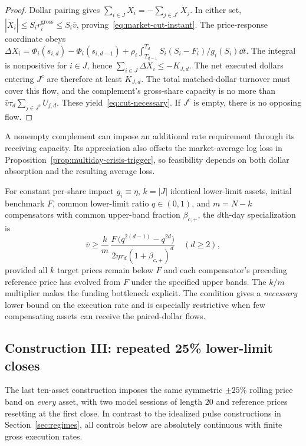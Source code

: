 \documentclass[review,hidelinks,onefignum,onetabnum]{siamonline250211}
\begin{document}
\begin{proof}
Dollar pairing gives $\sum_{i\in J}\dot X_i=-\sum_{j\in J^c}\dot X_j$. In either set, $|\dot X_i|\le S_i r_i^{\mathrm{gross}}\le S_i\bar v$, proving~\eqref{eq:market-cut-instant}. The price-response coordinate obeys
$\Delta X_i=\Phi_i(s_{i,d})-\Phi_i(s_{i,d-1})+
\rho_i\int_{T_{d-1}}^{T_d}S_i(S_i-F_i)/g_i(S_i)\dd t$.
The integral is nonpositive for $i\in J$, hence $\sum_{i\in J}\Delta X_i\le-K_{J,d}$. The net executed dollars entering $J^c$ are therefore at least $K_{J,d}$. The total matched-dollar turnover must cover this flow, and the complement's gross-share capacity is no more than $\bar v\tau_d\sum_{j\in J^c}U_{j,d}$. These yield~\eqref{eq:cut-necessary}. If $J^c$ is empty, there is no opposing flow.
\end{proof}
A nonempty complement can impose an additional rate requirement through its receiving capacity. Its appreciation also offsets the market-average log loss in Proposition~\ref{prop:multiday-crisis-trigger}, so feasibility depends on both dollar absorption and the resulting average loss.

For constant per-share impact $g_i\equiv\eta$, $k=|J|$ identical lower-limit assets, initial benchmark $F$, common lower-limit ratio $q\in(0,1)$, and $m=N-k$ compensators with common upper-band fraction $\beta_{c,+}$, the $d$th-day specialization is
\begin{equation}\label{eq:cut-special}
\bar v\ge \frac{k}{m}\,
\frac{F\,\big(q^{2(d-1)}-q^{2d}\big)}{2\eta\tau_d(1+\beta_{c,+})^{d}}\quad(d\ge2),
\end{equation}
provided all $k$ target prices remain below $F$ and each compensator's preceding reference price has evolved from $F$ under the specified upper bands. The $k/m$ multiplier makes the funding bottleneck explicit. The condition gives a \emph{necessary} lower bound on the execution rate and is especially restrictive when few compensating assets can receive the paired-dollar flows.

\subsection{Construction III: repeated 25\% lower-limit closes}
\label{subsec:two-day-limit}
The last ten-asset construction imposes the same symmetric $\pm25\%$ rolling price band on \emph{every} asset, with two model sessions of length $20$ and reference prices resetting at the first close. In contrast to the idealized pulse constructions in Section~\ref{sec:regimes}, all controls below are absolutely continuous with finite gross execution rates.
\end{document}

